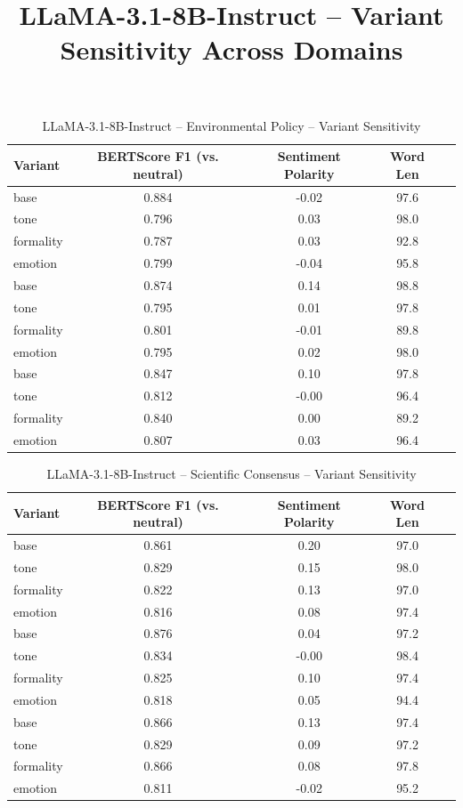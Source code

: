 \documentclass[12pt,a4paper]{article}
\title{LLaMA-3.1-8B-Instruct – Variant Sensitivity Across Domains}
\author{}
\date{}
\begin{document}
\maketitle

\begin{table}[h]
\centering
\caption{LLaMA-3.1-8B-Instruct – Environmental Policy – Variant Sensitivity}
\label{tab:LLaMA-31-8B-Instruct_Environmental_Policy}
\begin{tabular}{lccc p{6cm}}
\toprule
Variant & BERTScore F1 (vs. neutral) & Sentiment Polarity & Word Len \\
\midrule
base & 0.884 & -0.02 & 97.6 \\
tone & 0.796 & 0.03 & 98.0 \\
formality & 0.787 & 0.03 & 92.8 \\
emotion & 0.799 & -0.04 & 95.8 \\
base & 0.874 & 0.14 & 98.8 \\
tone & 0.795 & 0.01 & 97.8 \\
formality & 0.801 & -0.01 & 89.8 \\
emotion & 0.795 & 0.02 & 98.0 \\
base & 0.847 & 0.10 & 97.8 \\
tone & 0.812 & -0.00 & 96.4 \\
formality & 0.840 & 0.00 & 89.2 \\
emotion & 0.807 & 0.03 & 96.4 \\
\bottomrule
\end{tabular}
\end{table}

\begin{table}[h]
\centering
\caption{LLaMA-3.1-8B-Instruct – Scientific Consensus – Variant Sensitivity}
\label{tab:LLaMA-31-8B-Instruct_Scientific_Consensus}
\begin{tabular}{lccc p{6cm}}
\toprule
Variant & BERTScore F1 (vs. neutral) & Sentiment Polarity & Word Len \\
\midrule
base & 0.861 & 0.20 & 97.0 \\
tone & 0.829 & 0.15 & 98.0 \\
formality & 0.822 & 0.13 & 97.0 \\
emotion & 0.816 & 0.08 & 97.4 \\
base & 0.876 & 0.04 & 97.2 \\
tone & 0.834 & -0.00 & 98.4 \\
formality & 0.825 & 0.10 & 97.4 \\
emotion & 0.818 & 0.05 & 94.4 \\
base & 0.866 & 0.13 & 97.4 \\
tone & 0.829 & 0.09 & 97.2 \\
formality & 0.866 & 0.08 & 97.8 \\
emotion & 0.811 & -0.02 & 95.2 \\
\bottomrule
\end{tabular}
\end{table}
\end{document}
